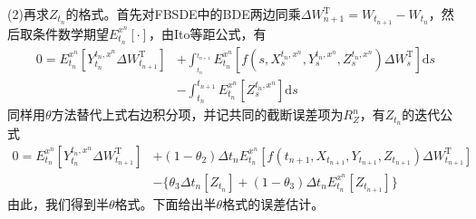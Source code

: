 			\par
			(2)再求$Z_{t_n}$的格式。首先对FBSDE中的BDE两边同乘${\Delta {W_{n+1}^\mathrm{T}} = W_{t_{n + 1}} - W_{t_n}}$，然后取条件数学期望$E_{t_n}^{x^n}[\cdot]$，由Ito等距公式，有
					\begin{equation*}
						\begin{split}
			0 = E_{t_n}^{x^n}[Y_{t_n}^{t_n,x^n} \Delta W_{t_{n + 1}}^\mathrm{T}] &+ \int_{_{t_n}}^{_{t_{n + 1}}} E_{{t_n}}^{x^n}[ f ( {s,X_{s}^{{t_n},{x^n}}},{Y_{s}^{{t_n},{x^n}}},{Z_{s}^{{t_n},{x^n}}})  \Delta W_s^\mathrm{T}]\mathrm{d}s \\
			&- \int_{t_n}^{t_{n + 1}} {E_{{t_n}}^{x^n}[ Z_{s}^{{t_n},{x^n}}]\mathrm{d}s}
						\end{split}
					\end{equation*}
			同样用$\theta$方法替代上式右边积分项，并记共同的截断误差项为$R_Z^n$，有$Z_{t_n}$的迭代公式
					\begin{equation*}
						\begin{split}
					0 = E_{{t_n}}^{x^n}[ {Y_{t_n}^{{t_n},{x^n}}  \Delta W_{t_{n + 1}}^\mathrm{T}}] &+ ({1 - {\theta _2}})\Delta {t_n}E_{{t_n}}^{x^n}[{f\left( {{t_{n + 1}},{X_{{t_{n + 1}}}},{Y_{{t_{n + 1}}}},{Z_{{t_{n + 1}}}}} \right)\Delta W_{{t_{n + 1}}}^\mathrm{T}}]\\
					& - \{ {{\theta _3}\Delta {t_n}[{{Z_{{t_n}}}} ] + ({1 - {\theta _3}})\Delta {t_n}E_{{t_n}}^{x^n}[ {{Z_{{t_{n + 1}}}}}]} \}
						\end{split}
					\end{equation*}
			由此，我们得到半$\theta$格式。下面给出半$\theta$格式的误差估计。
